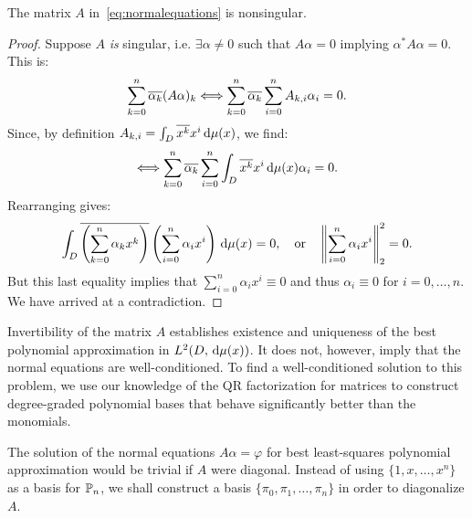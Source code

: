 \begin{theorem}
The matrix $A$ in~\eqref{eq:normalequations} is nonsingular.
\end{theorem}
\begin{proof}
Suppose $A$ {\em is} singular, i.e. $\exists \alpha\ne 0$ such that $A\alpha = 0$ implying $\alpha^* A\alpha = 0$. This is:
\begin{equation}
\sum_{k=0}^n\conj{\alpha_k}(A\alpha)_k \Longleftrightarrow \sum_{k=0}^n\conj{\alpha_k}\sum_{i=0}^nA_{k,i}\alpha_i = 0.
\end{equation}
Since, by definition $A_{k,i} = \int_D \conj{x^k}x^i\ud\mu(x)$, we find:
\begin{equation}
\Longleftrightarrow \sum_{k=0}^n \conj{\alpha_k} \sum_{i=0}^n \int_D \conj{x^k}x^i\ud\mu(x) \alpha_i = 0.
\end{equation}
Rearranging gives:
\begin{equation}
\int_D\conj{\pr(\sum_{k=0}^n \alpha_kx^k)}\pr(\sum_{i=0}^n \alpha_ix^i)\ud\mu(x) = 0,\quad{\rm or}\quad \left\|\sum_{i=0}^n \alpha_i x^i\right\|_2^2 = 0.
\end{equation}
But this last equality implies that $\sum_{i=0}^n\alpha_ix^i\equiv0$ and thus $\alpha_i\equiv0$ for $i=0,\ldots,n$. We have arrived at a contradiction.
\end{proof}
Invertibility of the matrix $A$ establishes existence and uniqueness of the best polynomial approximation in $L^2(D,\ud\mu(x))$. It does not, however, imply that the normal equations are well-conditioned. To find a well-conditioned solution to this problem, we use our knowledge of the QR factorization for matrices to construct degree-graded polynomial bases that behave significantly better than the monomials.

The solution of the normal equations $A\alpha = \varphi$ for best least-squares polynomial approximation would be trivial if $A$ were diagonal. Instead of using $\{1,x,\ldots,x^n\}$ as a basis for $\P_n$, we shall construct a basis $\{\pi_0,\pi_1,\ldots,\pi_n\}$ in order to diagonalize $A$.

